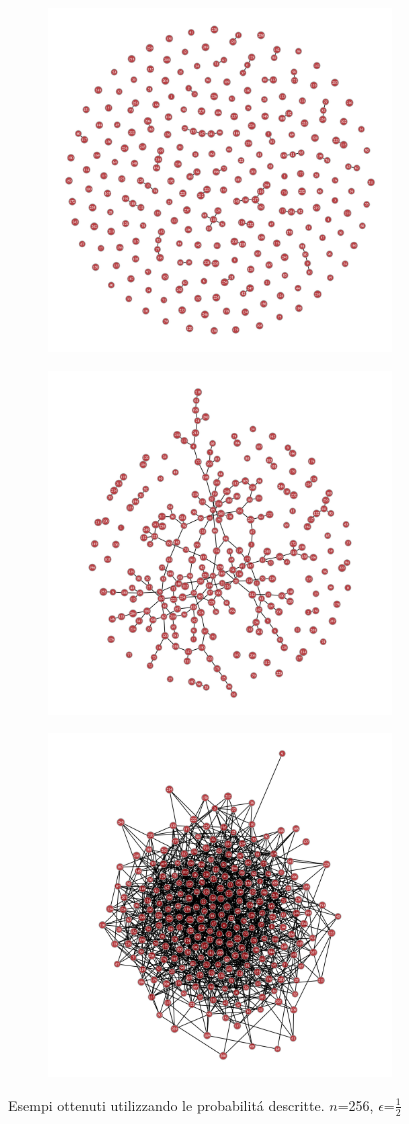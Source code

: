 \documentclass[../Tesi.tex]{subfiles}
\begin{document}
\begin{figure}[H]
\centering
    \begin{subfigure}{0.3\textwidth}
      \centering
      \includegraphics[width=0.6\linewidth]{imgs/ER_Examples/ER_SP.png}
      \caption{}
      \label{fig:sub1}
    \end{subfigure}%
    \begin{subfigure}{0.3\textwidth}
      \centering
      \includegraphics[width=0.6\linewidth]{imgs/ER_Examples/ER_GC.png}
      \caption{}
      \label{fig:sub2}
    \end{subfigure}
    \begin{subfigure}{0.3\textwidth}
      \centering
      \includegraphics[width=0.6\linewidth]{imgs/ER_Examples/ER_DN.png}
      \caption{}
      \label{fig:sub1}
    \end{subfigure}%
\caption{Esempi ottenuti utilizzando le probabilit\'a descritte. $n$=256, $\epsilon$=$\frac{1}{2}$}
\label{img:ER_exapmles}
\end{figure}
\end{document}
